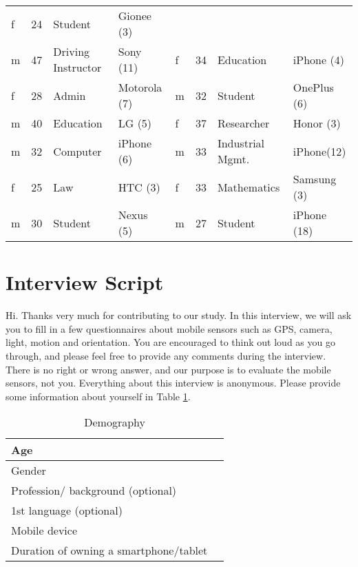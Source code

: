 \documentclass[10pt,twocolumn]{article}
\begin{document}
\begin{table*}[t]
\begin{tabular}{|l|l|l|l||l|l|l|l|}
f& 24& Student& Gionee (3)\\
m& 47& Driving Instructor& Sony (11)&
f& 34& Education & iPhone  (4)\\
f& 28& Admin& Motorola (7)&
m& 32& Student& OnePlus (6)\\
m& 40& Education& LG (5)&
f& 37& Researcher& Honor (3)\\
m& 32& Computer & iPhone (6)&
m& 33& Industrial Mgmt.& iPhone(12)\\
f& 25& Law& HTC (3)&
f& 33& Mathematics& Samsung (3)\\
m& 30& Student& Nexus (5)&
m& 27& Student& iPhone (18)\\
\hline
\end{tabular}
\caption{Participants' self-reported demographics in the two studies, (y) indicates the years of owning a smartphone}
\label{dem}
\end{table*}
\section{Interview Script}
\label{inter}
Hi. Thanks very much for contributing to our study. In this interview, we will ask you to fill in a few questionnaires about mobile sensors such as GPS, camera, light, motion and orientation.  
You are encouraged to think out loud as you go through, and please feel free to provide any comments during the interview. There is no right or wrong answer, and our purpose is to evaluate the mobile sensors, not you. 
Everything about this interview is anonymous. Please provide some information about yourself in Table \ref{infoo}.
\begin {table}[h]
\begin{center}
 \begin{tabular} { | l | l | }
 \hline
 Age & \\ \hline
 Gender & \\ \hline
 Profession/ background (optional) & \\ \hline
 1st language (optional)& \\ \hline
 Mobile device   & \\ \hline
 Duration of owning a smartphone/tablet   & \\ 
  \hline
\end{tabular}
\caption{Demography}
\label{infoo}
\end{center}
\end {table}
\end{document}
